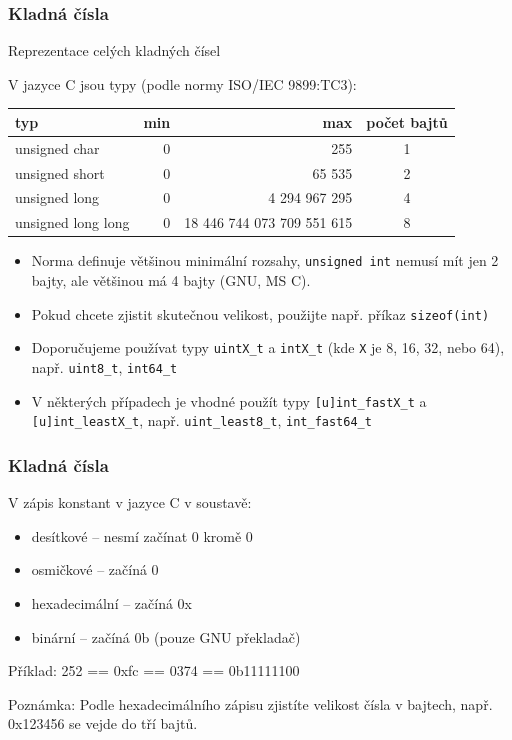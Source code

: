 \begin{frame}
\frametitle{Kladná čísla}
Reprezentace celých kladných čísel

V jazyce C jsou typy (podle normy ISO/IEC 9899:TC3):
\begin{tabular}{|l|r|r|c|}\hline
typ & min & max & počet bajtů\\ \hline
unsigned char & 0 & 255 & 1 \\ \hline
unsigned short & 0 & 65 535 & 2 \\ \hline 
unsigned long & 0 & 4 294 967 295 & 4 \\ \hline
unsigned long long & 0 & 18 446 744 073 709 551 615 & 8 \\ \hline
\end{tabular}

\begin{itemize}
\item Norma definuje většinou minimální rozsahy, \texttt{unsigned int} nemusí mít jen 2 bajty, ale většinou má 4 bajty (GNU, MS C).
\item Pokud chcete zjistit skutečnou velikost, použijte např. příkaz \texttt{sizeof(int)}
\item Doporučujeme používat typy \texttt{uintX\_t} a \texttt{intX\_t} (kde \texttt{X} je 8, 16, 32, nebo 64), např. \texttt{uint8\_t}, \texttt{int64\_t} 
\item V některých případech je vhodné použít typy \texttt{[u]int\_fastX\_t} a \texttt{[u]int\_leastX\_t}, např. \texttt{uint\_least8\_t}, \texttt{int\_fast64\_t} 
\end{itemize}

\end{frame}


\begin{frame}
\frametitle{Kladná čísla}
V zápis konstant v jazyce C v soustavě:
\begin{itemize}
\item desítkové -- nesmí začínat 0 kromě 0
\item osmičkové -- začíná 0
\item hexadecimální -- začíná 0x
\item binární -- začíná 0b (pouze GNU překladač)
\end{itemize}
\bigskip
Příklad: 252 == 0xfc == 0374 == 0b11111100
\bigskip

Poznámka: Podle hexadecimálního zápisu zjistíte velikost čísla v bajtech, např. 0x123456 se vejde do tří bajtů.
\end{frame}


